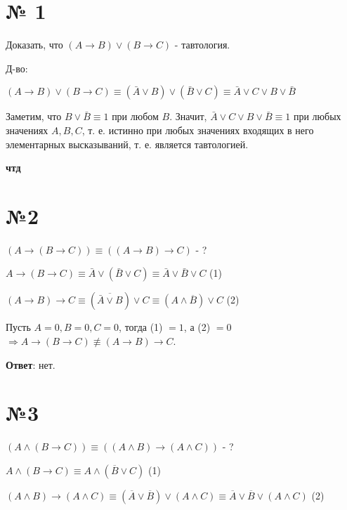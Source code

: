 \documentclass[a4paper,16pt]{article}
\author{Сидоров Дмитрий}
\title{}
\begin{document}
	
	\noindent
	\maketitle
	\section*{№ 1}
	
	Доказать, что $(A \to B) \vee (B \to C) $ - тавтология.
	
	Д-во:
	
	$(A \to B) \vee (B \to C) \equiv (\bar{A} \vee B) \vee (\bar{B} \vee C) \equiv \bar{A} \vee C \vee B \vee \bar{B}$
	
	Заметим, что $B \vee \bar{B} \equiv 1$ при любом $B$. Значит, $\bar{A} \vee C \vee B \vee \bar{B} \equiv 1$ при любых значениях $A, B, C$, т. е. истинно при любых значениях входящих в него элементарных высказываний, т. е. является тавтологией.
	
	\begin{flushright}
		\textbf{чтд}
	\end{flushright}

	\section*{№2}
	
	$(A \to (B \to C)) \equiv ((A \to B) \to C)$ - ?
	
	$A \to (B \to C) \equiv \bar{A} \vee (\bar{B} \vee C) \equiv \bar{A} \vee \bar{B} \vee C $ (1)
	
	$(A \to B) \to C \equiv (\overline{\bar{A} \vee B}) \vee C \equiv (A \land \overline{B}) \lor C $ (2)
	
	Пусть  $A = 0, B = 0, C = 0$, тогда (1) $= 1$, а (2) $= 0$ $\Rightarrow A \to (B \to C) \not
	\equiv (A \to B) \to C$.
	
	\textbf{Ответ}: нет.
	
	\section*{№3}
	
	$(A \land (B \to C)) \equiv ((A \land B) \to (A \land C)) $ - ?
	
	$A \land (B \to C) \equiv A \land (\overline{B} \lor C) $ (1)
	
	$(A \land B) \to (A \land C) \equiv (\overline{A} \lor \overline{B}) \lor (A \land C) \equiv 
	\overline{A} \lor \overline{B} \lor (A \land C)$ (2)
	
\end{document}
